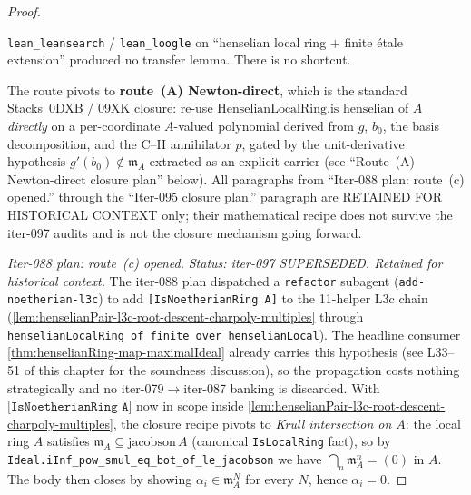 \begin{proof}
\begin{itemize}
\texttt{lean\_leansearch} / \texttt{lean\_loogle} on
``henselian local ring $+$ finite étale extension'' produced no
transfer lemma. There is no shortcut.
\end{itemize}
The route pivots to \textbf{route~(A) Newton-direct}, which is the
standard Stacks~0DXB / 09XK closure: re-use
$\mathrm{HenselianLocalRing.is\_henselian}$ of $A$ \emph{directly}
on a per-coordinate $A$-valued polynomial derived from $g$, $b_0$,
the basis decomposition, and the C--H annihilator $p$, gated by
the unit-derivative hypothesis $g'(b_0) \notin \mathfrak m_A$
extracted as an explicit carrier (see ``Route~(A) Newton-direct
closure plan'' below). All paragraphs from ``Iter-088 plan:
route~(c) opened.'' through the ``Iter-095 closure plan.''
paragraph are RETAINED FOR HISTORICAL CONTEXT only; their
mathematical recipe does not survive the iter-097 audits and is
not the closure mechanism going forward.

\textit{Iter-088 plan: route~(c) opened.} \textit{Status:
iter-097 SUPERSEDED. Retained for historical context.}
The iter-088 plan
dispatched a \texttt{refactor} subagent
(\texttt{add-noetherian-l3c}) to add \texttt{[IsNoetherianRing A]}
to the 11-helper L3c chain
(\cref{lem:henselianPair-l3c-root-descent-charpoly-multiples}
through \texttt{henselianLocalRing\_of\_finite\_over\_henselianLocal}).
The headline consumer
\cref{thm:henselianRing-map-maximalIdeal} already carries this
hypothesis (see L33--51 of this chapter for the soundness
discussion), so the propagation costs nothing strategically and
no iter-079$\to$iter-087 banking is discarded. With
$\texttt{[IsNoetherianRing A]}$ now in scope inside
\cref{lem:henselianPair-l3c-root-descent-charpoly-multiples}, the
closure recipe pivots to \emph{Krull intersection on $A$}: the
local ring $A$ satisfies $\mathfrak m_A \subseteq \mathrm{jacobson}\,A$
(canonical \texttt{IsLocalRing} fact), so by
\texttt{Ideal.iInf\_pow\_smul\_eq\_bot\_of\_le\_jacobson} we have
$\bigcap_n \mathfrak m_A^n = (0)$ in $A$. The body then closes by
showing $\alpha_i \in \mathfrak m_A^N$ for every $N$, hence
$\alpha_i = 0$.


\end{proof}
